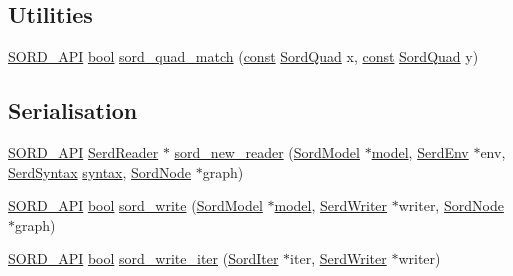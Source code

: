\subsection*{Utilities}
\begin{DoxyCompactItemize}
\item 
\hyperlink{sord_8h_a1a2e27663366eb6ff41e062a0a880f48}{S\+O\+R\+D\+\_\+\+A\+PI} \hyperlink{mac_2config_2i386_2lib-src_2libsoxr_2soxr-config_8h_abb452686968e48b67397da5f97445f5b}{bool} \hyperlink{group__sord_ga6276430f3de7c4c4ab8e53ef2c452f1b}{sord\+\_\+quad\+\_\+match} (\hyperlink{getopt1_8c_a2c212835823e3c54a8ab6d95c652660e}{const} \hyperlink{group__sord_gac79773a042527877d00158c75a41bab2}{Sord\+Quad} x, \hyperlink{getopt1_8c_a2c212835823e3c54a8ab6d95c652660e}{const} \hyperlink{group__sord_gac79773a042527877d00158c75a41bab2}{Sord\+Quad} y)
\end{DoxyCompactItemize}
\subsection*{Serialisation}
\begin{DoxyCompactItemize}
\item 
\hyperlink{sord_8h_a1a2e27663366eb6ff41e062a0a880f48}{S\+O\+R\+D\+\_\+\+A\+PI} \hyperlink{group__serd_ga69c709eacb062f9e7777726ec80b2796}{Serd\+Reader} $\ast$ \hyperlink{group__sord_gad18f6cefc887a7fdcd4a0a02f9c382e6}{sord\+\_\+new\+\_\+reader} (\hyperlink{group__sord_gaea018cfebfedd10280b1d8dd6d650a28}{Sord\+Model} $\ast$\hyperlink{lib_2expat_8h_ac517f0c27408fbd365e7dd34e032faca}{model}, \hyperlink{group__serd_gaea4226dd80abea7afa05986f195d4755}{Serd\+Env} $\ast$env, \hyperlink{group__serd_ga42683406fcfa9046b28dd951cefd3391}{Serd\+Syntax} \hyperlink{cmdline_8c_a9aea52a77da0039230114dcf40c98aa6}{syntax}, \hyperlink{group__sord_ga804ac7d56d9fdea50f2d1e7278b1f82b}{Sord\+Node} $\ast$graph)
\item 
\hyperlink{sord_8h_a1a2e27663366eb6ff41e062a0a880f48}{S\+O\+R\+D\+\_\+\+A\+PI} \hyperlink{mac_2config_2i386_2lib-src_2libsoxr_2soxr-config_8h_abb452686968e48b67397da5f97445f5b}{bool} \hyperlink{group__sord_ga0f18c2f00df8b705db63df1058296a61}{sord\+\_\+write} (\hyperlink{group__sord_gaea018cfebfedd10280b1d8dd6d650a28}{Sord\+Model} $\ast$\hyperlink{lib_2expat_8h_ac517f0c27408fbd365e7dd34e032faca}{model}, \hyperlink{group__serd_gaaaa09490e19dff0180251f1e2524e6f0}{Serd\+Writer} $\ast$writer, \hyperlink{group__sord_ga804ac7d56d9fdea50f2d1e7278b1f82b}{Sord\+Node} $\ast$graph)
\item 
\hyperlink{sord_8h_a1a2e27663366eb6ff41e062a0a880f48}{S\+O\+R\+D\+\_\+\+A\+PI} \hyperlink{mac_2config_2i386_2lib-src_2libsoxr_2soxr-config_8h_abb452686968e48b67397da5f97445f5b}{bool} \hyperlink{group__sord_gab77fdaf578d114d670e4823a366aa039}{sord\+\_\+write\+\_\+iter} (\hyperlink{group__sord_ga59314650e0ab9b1cdeebc0bf7a0419fa}{Sord\+Iter} $\ast$iter, \hyperlink{group__serd_gaaaa09490e19dff0180251f1e2524e6f0}{Serd\+Writer} $\ast$writer)
\end{DoxyCompactItemize}


